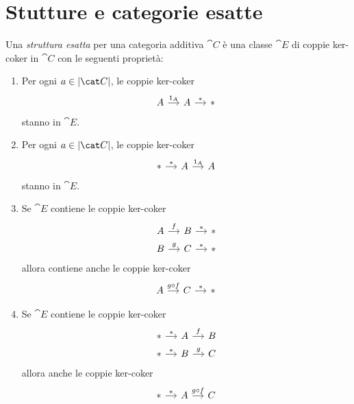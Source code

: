 \section{Stutture e categorie esatte}

\begin{definition}\label{definition:CategorieEsatte}
  Una {\em struttura esatta} per una categoria additiva \(\cat C\) è una
  classe \(\cat E\) di coppie ker-coker in \(\cat C\) con le seguenti
  proprietà:
  \begin{enumerate}[leftmargin=*, label=(E\arabic*),
    ref=Definizione~\ref{definition:CategorieEsatte}-E\arabic*]
  \item \label{item:EO} Per ogni \(a \in \objcat C\), le coppie
    ker-coker
    \[
      \begin{tikzcd}[column sep=small]
        A \ar["{\id_A}", r] & A \ar["{\ast}", r] & \ast
      \end{tikzcd}
    \]
    stanno in \(\cat E\).
  \item \label{item:EOop} Per ogni \(a \in \objcat C\), le coppie
    ker-coker
    \[
      \begin{tikzcd}[column sep=small]
        \ast \ar["{\ast}", r] & A \ar["{\id_A}", r] & A
      \end{tikzcd}
    \]
    stanno in \(\cat E\).
  \item \label{item:E1} Se \(\cat E\) contiene le coppie ker-coker
    \[
      \begin{tikzcd}[column sep=small, row sep=tiny]
        A \ar["{f}", r] & B \ar["{\ast}", r] & \ast \\
        B \ar["{g}", r] & C \ar["{\ast}", r] & \ast
      \end{tikzcd}
    \]
    allora contiene anche le coppie ker-coker
    \[
      \begin{tikzcd}[column sep=small]
        A \ar["{g \circ f}", r] & C \ar["{\ast}", r] & \ast
      \end{tikzcd}
    \]
  \item \label{item:E1op} Se \(\cat E\) contiene le coppie ker-coker
    \[
      \begin{tikzcd}[column sep=small, row sep=tiny]
        \ast \ar["{\ast}", r] & A \ar["{f}", r] & B \\
        \ast \ar["{\ast}", r] & B \ar["{g}", r] & C
      \end{tikzcd}
    \]
    allora anche le coppie ker-coker
    \[
      \begin{tikzcd}[column sep=small]
        \ast \ar["{\ast}", r] & A \ar["{g \circ f}", r] & C

\end{tikzcd}\]
\end{enumerate}
\end{definition}
